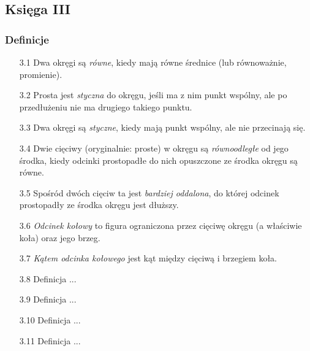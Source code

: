 %


\subsection{Księga III}
\subsubsection{Definicje}
\begin{enumerate}
    \item [3.1] Dwa okręgi są \emph{równe}, kiedy mają równe średnice (lub równoważnie, promienie).
    \item [3.2] Prosta jest \emph{styczna} do okręgu, jeśli ma z nim punkt wspólny, ale po przedłużeniu nie ma drugiego takiego punktu.
    \item [3.3] Dwa okręgi są \emph{styczne}, kiedy mają punkt wspólny, ale nie przecinają się.
    \item [3.4] Dwie cięciwy (oryginalnie: proste) w okręgu są \emph{równoodległe} od jego środka, kiedy odcinki prostopadłe do nich opuszczone ze środka okręgu są równe.
    \item [3.5] Spośród dwóch cięciw ta jest \emph{bardziej oddalona}, do której odcinek prostopadły ze środka okręgu jest dłuższy.
    \item [3.6] \emph{Odcinek kołowy} to figura ograniczona przez cięciwę okręgu (a właściwie koła) oraz jego brzeg.
    \item [3.7] \emph{Kątem odcinka kołowego} jest kąt między cięciwą i brzegiem koła.
    \item [3.8] Definicja ...
    \item [3.9] Definicja ...
    \item [3.10] Definicja ...
    \item [3.11] Definicja ...
\end{enumerate}

